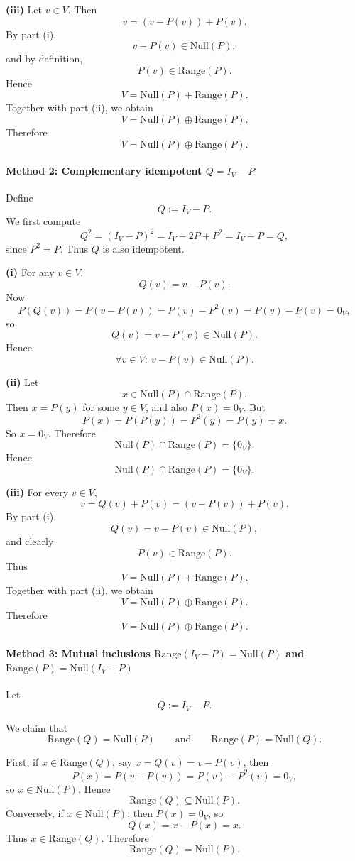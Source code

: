 \documentclass[12pt]{article}
\begin{document}
\medskip

\noindent \textbf{(iii)} Let \(v\in V\). Then
\[
v=(v-P(v))+P(v).
\]
By part (i),
\[
v-P(v)\in \mathrm{Null}(P),
\]
and by definition,
\[
P(v)\in \mathrm{Range}(P).
\]
Hence
\[
V=\mathrm{Null}(P)+\mathrm{Range}(P).
\]
Together with part (ii), we obtain
\[
V=\mathrm{Null}(P)\oplus \mathrm{Range}(P).
\]
Therefore
\[
\boxed{V=\mathrm{Null}(P)\oplus \mathrm{Range}(P).}
\]

\newpage
\paragraph{Method 2: Complementary idempotent \(Q=I_V-P\)}

Define
\[
Q:=I_V-P.
\]
We first compute
\[
Q^2=(I_V-P)^2=I_V-2P+P^2=I_V-P=Q,
\]
since \(P^2=P\). Thus \(Q\) is also idempotent.

\noindent \textbf{(i)} For any \(v\in V\),
\[
Q(v)=v-P(v).
\]
Now
\[
P(Q(v))=P(v-P(v))=P(v)-P^2(v)=P(v)-P(v)=0_V,
\]
so
\[
Q(v)=v-P(v)\in \mathrm{Null}(P).
\]
Hence
\[
\boxed{\forall v\in V:\ v-P(v)\in \mathrm{Null}(P).}
\]

\medskip

\noindent \textbf{(ii)} Let
\[
x\in \mathrm{Null}(P)\cap \mathrm{Range}(P).
\]
Then \(x=P(y)\) for some \(y\in V\), and also \(P(x)=0_V\). But
\[
P(x)=P(P(y))=P^2(y)=P(y)=x.
\]
So \(x=0_V\). Therefore
\[
\mathrm{Null}(P)\cap \mathrm{Range}(P)=\{0_V\}.
\]
Hence
\[
\boxed{\mathrm{Null}(P)\cap \mathrm{Range}(P)=\{0_V\}.}
\]

\medskip

\noindent \textbf{(iii)} For every \(v\in V\),
\[
v=Q(v)+P(v)=(v-P(v))+P(v).
\]
By part (i),
\[
Q(v)=v-P(v)\in \mathrm{Null}(P),
\]
and clearly
\[
P(v)\in \mathrm{Range}(P).
\]
Thus
\[
V=\mathrm{Null}(P)+\mathrm{Range}(P).
\]
Together with part (ii), we obtain
\[
V=\mathrm{Null}(P)\oplus \mathrm{Range}(P).
\]
Therefore
\[
\boxed{V=\mathrm{Null}(P)\oplus \mathrm{Range}(P).}
\]

\paragraph{Method 3: Mutual inclusions \(\mathrm{Range}(I_V-P)=\mathrm{Null}(P)\) and \(\mathrm{Range}(P)=\mathrm{Null}(I_V-P)\)}

Let
\[
Q:=I_V-P.
\]

We claim that
\[
\mathrm{Range}(Q)=\mathrm{Null}(P)
\qquad\text{and}\qquad
\mathrm{Range}(P)=\mathrm{Null}(Q).
\]

First, if \(x\in \mathrm{Range}(Q)\), say \(x=Q(v)=v-P(v)\), then
\[
P(x)=P(v-P(v))=P(v)-P^2(v)=0_V,
\]
so \(x\in \mathrm{Null}(P)\). Hence
\[
\mathrm{Range}(Q)\subseteq \mathrm{Null}(P).
\]
Conversely, if \(x\in \mathrm{Null}(P)\), then \(P(x)=0_V\), so
\[
Q(x)=x-P(x)=x.
\]
Thus \(x\in \mathrm{Range}(Q)\). Therefore
\[
\mathrm{Range}(Q)=\mathrm{Null}(P).
\]
\end{document}
